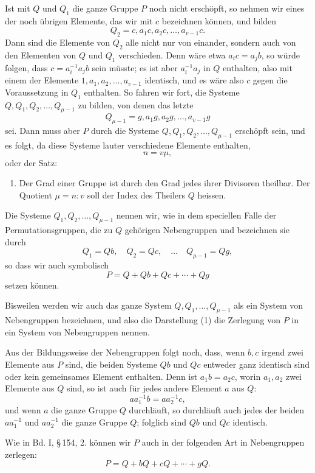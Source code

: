 \documentclass[11pt]{article}
\begin{document}
Ist mit $Q$ und $Q_1$ die ganze Gruppe $P$ noch nicht erschöpft, so nehmen wir eines der noch übrigen Elemente, das wir mit $c$ bezeichnen können, und bilden
\[
Q_2=c,a_1c,a_2c,\ldots,a_{v-1}c.
\]
Dann sind die Elemente von $Q_2$ alle nicht nur von einander, sondern auch von den Elementen von $Q$ und $Q_1$ verschieden. Denn wäre etwa $a_i c=a_j b$, so würde folgen, dass $c=a_i^{-1}a_jb$ sein müsste; es ist aber $a_i^{-1}a_j$ in $Q$ enthalten, also mit einem der Elemente $1,a_1,a_2,\ldots,a_{v-1}$ identisch, und es wäre also $c$ gegen die Voraussetzung in $Q_1$ enthalten. So fahren wir fort, die Systeme $Q,Q_1,Q_2,\ldots,Q_{\mu-1}$ zu bilden, von denen das letzte
\[
Q_{\mu-1}=g,a_1g,a_2g,\ldots,a_{v-1}g
\]
sei. Dann muss aber $P$ durch die Systeme $Q,Q_1,Q_2,\ldots,Q_{\mu-1}$ erschöpft sein, und es folgt, da diese Systeme lauter verschiedene Elemente enthalten,
\[
n=v\mu,
\]
oder der Satz:
\begin{enumerate}[label=\arabic*.]
\item Der Grad einer Gruppe ist durch den Grad jedes ihrer Divisoren theilbar. Der Quotient $\mu=n:v$ soll der Index des Theilers $Q$ heissen.
\end{enumerate}
Die Systeme $Q_1,Q_2,\ldots,Q_{\mu-1}$ nennen wir, wie in dem speciellen Falle der Permutationsgruppen, die zu $Q$ gehörigen Nebengruppen und bezeichnen sie durch
\[
Q_1=Qb,\quad Q_2=Qc,\quad\ldots\quad Q_{\mu-1}=Qg,
\]
so dass wir auch symbolisch
\begin{equation}
P=Q+Qb+Qc+\cdots+Qg
\tag{1}
\end{equation}
setzen können.

Bisweilen werden wir auch das ganze System $Q,Q_1,\ldots,Q_{\mu-1}$ als ein System von Nebengruppen bezeichnen, und also die Darstellung (1) die Zerlegung von $P$ in ein System von Nebengruppen nennen.

Aus der Bildungsweise der Nebengruppen folgt noch, dass, wenn $b,c$ irgend zwei Elemente aus $P$ sind, die beiden Systeme $Qb$ und $Qc$ entweder ganz identisch sind oder kein gemeinsames Element enthalten. Denn ist $a_1b=a_2c$, worin $a_1,a_2$ zwei Elemente aus $Q$ sind, so ist auch für jedes andere Element $a$ aus $Q$:
\[
aa_1^{-1}b=aa_2^{-1}c,
\]
und wenn $a$ die ganze Gruppe $Q$ durchläuft, so durchläuft auch jedes der beiden $aa_1^{-1}$ und $aa_2^{-1}$ die ganze Gruppe $Q$; folglich sind $Qb$ und $Qc$ identisch.

Wie in Bd. I, \S\,154, 2. können wir $P$ auch in der folgenden Art in Nebengruppen zerlegen:
\[
P=Q+bQ+cQ+\cdots+gQ.
\]
\end{document}
